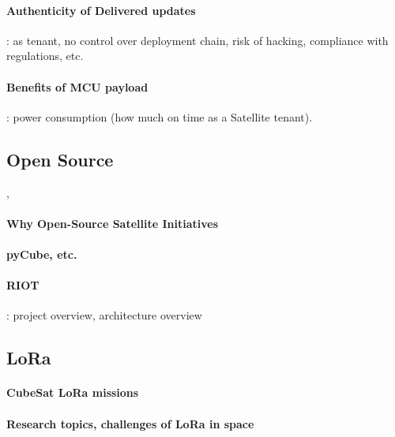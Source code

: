 \paragraph*{Authenticity of Delivered updates}: as tenant, no control over deployment
chain, risk of hacking, compliance with regulations, etc.
\paragraph*{Benefits of MCU payload}: power consumption (how much
on time as a Satellite tenant).

\subsection{Open Source} \cite{shalashov2021OpenSourceCubeSatReview}, \cite{Holliday2019PyCubed}
\paragraph*{Why Open-Source Satellite Initiatives}
\paragraph*{pyCube, etc.}
\paragraph*{RIOT}: project overview, architecture overview\cite{baccelli2018riot}


\subsection{LoRa}
\label{sec:lora-cubesat}
\paragraph*{CubeSat LoRa missions} \cite{saeed2020CubeSatReview}
\paragraph*{Research topics, challenges of LoRa in space} \cite{saeed2020CubeSatReview}
